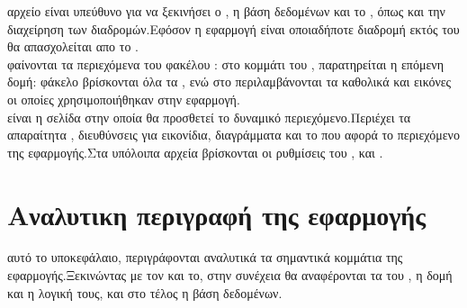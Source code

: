  αρχείο  είναι υπεύθυνο για να ξεκινήσει ο , η βάση δεδομένων και το , όπως και την διαχείρηση των διαδρομών.Εφόσον η εφαρμογή είναι  οποιαδήποτε διαδρομή εκτός του  θα απασχολείται απο το .\\
 φαίνονται τα περιεχόμενα του φακέλου : 
\pagebreak
{} στο κομμάτι του , παρατηρείται η επόμενη δομή:
 φάκελο  βρίσκονται όλα τα , ενώ στο  περιλαμβάνονται τα καθολικά  και εικόνες οι οποίες χρησιμοποιήθηκαν στην εφαρμογή.\\
  είναι η σελίδα στην οποία θα προσθετεί το δυναμικό περιεχόμενο.Περιέχει τα απαραίτητα , διευθύνσεις για εικονίδια, διαγράμματα και το  που αφορά το περιεχόμενο της εφαρμογής.Στα υπόλοιπα αρχεία βρίσκονται οι ρυθμίσεις του ,  και .

\section{Αναλυτικη περιγραφή της εφαρμογής}
 αυτό το υποκεφάλαιο, περιγράφονται αναλυτικά τα σημαντικά κομμάτια της εφαρμογής.Ξεκινώντας με τον  και το, στην συνέχεια θα αναφέρονται τα  του , η δομή και η λογική τους, και στο τέλος η βάση δεδομένων.

